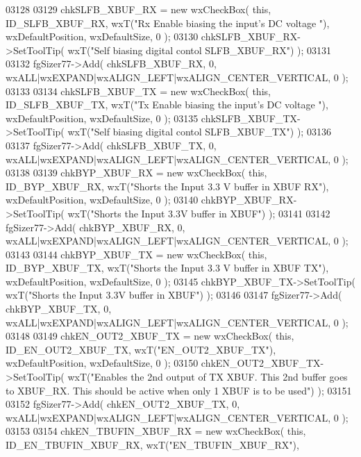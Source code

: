\begin{DoxyCode}
03128     
03129     chkSLFB_XBUF_RX = \textcolor{keyword}{new} wxCheckBox( \textcolor{keyword}{this}, ID_SLFB_XBUF_RX, wxT(\textcolor{stringliteral}{"Rx Enable biasing the input's DC voltage 
      "}), wxDefaultPosition, wxDefaultSize, 0 );
03130     chkSLFB_XBUF_RX->SetToolTip( wxT(\textcolor{stringliteral}{"Self biasing digital contol SLFB\_XBUF\_RX"}) );
03131     
03132     fgSizer77->Add( chkSLFB_XBUF_RX, 0, wxALL|wxEXPAND|wxALIGN\_LEFT|wxALIGN\_CENTER\_VERTICAL, 0 );
03133     
03134     chkSLFB_XBUF_TX = \textcolor{keyword}{new} wxCheckBox( \textcolor{keyword}{this}, ID_SLFB_XBUF_TX, wxT(\textcolor{stringliteral}{"Tx Enable biasing the input's DC voltage 
      "}), wxDefaultPosition, wxDefaultSize, 0 );
03135     chkSLFB_XBUF_TX->SetToolTip( wxT(\textcolor{stringliteral}{"Self biasing digital contol SLFB\_XBUF\_TX"}) );
03136     
03137     fgSizer77->Add( chkSLFB_XBUF_TX, 0, wxALL|wxEXPAND|wxALIGN\_LEFT|wxALIGN\_CENTER\_VERTICAL, 0 );
03138     
03139     chkBYP_XBUF_RX = \textcolor{keyword}{new} wxCheckBox( \textcolor{keyword}{this}, ID_BYP_XBUF_RX, wxT(\textcolor{stringliteral}{"Shorts the Input 3.3 V buffer in XBUF RX"}),
       wxDefaultPosition, wxDefaultSize, 0 );
03140     chkBYP_XBUF_RX->SetToolTip( wxT(\textcolor{stringliteral}{"Shorts the Input 3.3V buffer in XBUF"}) );
03141     
03142     fgSizer77->Add( chkBYP_XBUF_RX, 0, wxALL|wxEXPAND|wxALIGN\_LEFT|wxALIGN\_CENTER\_VERTICAL, 0 );
03143     
03144     chkBYP_XBUF_TX = \textcolor{keyword}{new} wxCheckBox( \textcolor{keyword}{this}, ID_BYP_XBUF_TX, wxT(\textcolor{stringliteral}{"Shorts the Input 3.3 V buffer in XBUF TX"}),
       wxDefaultPosition, wxDefaultSize, 0 );
03145     chkBYP_XBUF_TX->SetToolTip( wxT(\textcolor{stringliteral}{"Shorts the Input 3.3V buffer in XBUF"}) );
03146     
03147     fgSizer77->Add( chkBYP_XBUF_TX, 0, wxALL|wxEXPAND|wxALIGN\_LEFT|wxALIGN\_CENTER\_VERTICAL, 0 );
03148     
03149     chkEN_OUT2_XBUF_TX = \textcolor{keyword}{new} wxCheckBox( \textcolor{keyword}{this}, ID_EN_OUT2_XBUF_TX, wxT(\textcolor{stringliteral}{"EN\_OUT2\_XBUF\_TX"}), 
      wxDefaultPosition, wxDefaultSize, 0 );
03150     chkEN_OUT2_XBUF_TX->SetToolTip( wxT(\textcolor{stringliteral}{"Enables the 2nd output of TX XBUF. This 2nd buffer goes to
       XBUF\_RX. This should be active when only 1 XBUF is to be used"}) );
03151     
03152     fgSizer77->Add( chkEN_OUT2_XBUF_TX, 0, wxALL|wxEXPAND|wxALIGN\_LEFT|wxALIGN\_CENTER\_VERTICAL, 0 );
03153     
03154     chkEN_TBUFIN_XBUF_RX = \textcolor{keyword}{new} wxCheckBox( \textcolor{keyword}{this}, ID_EN_TBUFIN_XBUF_RX, wxT(\textcolor{stringliteral}{"EN\_TBUFIN\_XBUF\_RX"}), 

\end{DoxyCode}
